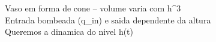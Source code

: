 \documentclass[preview]{standalone}
\begin{document}
Vaso em forma de cone -- volume varia com h^{3}\\Entrada bombeada (q\_in) e saida dependente da altura\\Queremos a dinamica do nivel h(t)\\
\end{document}
